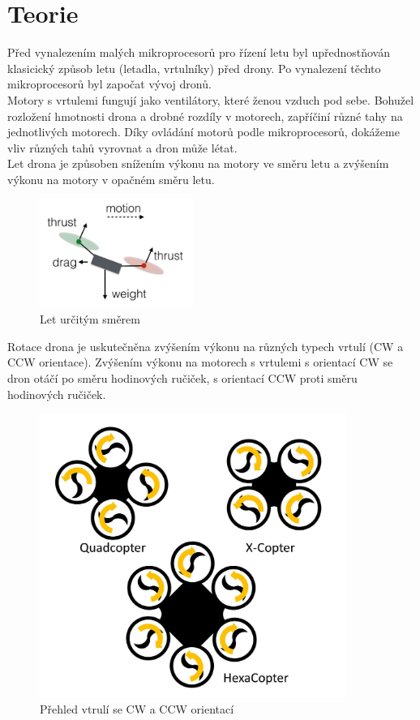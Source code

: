 \chapter{Teorie}
\label{2-teorie}

Před vynalezením malých mikroprocesorů pro řízení letu byl upřednostňován klasicický způsob letu (letadla, vrtulníky) před drony. Po vynalezení těchto mikroprocesorů byl započat vývoj dronů.\\
Motory s vrtulemi fungují jako ventilátory, které ženou vzduch pod sebe. Bohužel rozložení hmotnosti drona a drobné rozdíly v motorech, zapříčiní různé tahy na jednotlivých motorech. Díky ovládání motorů podle mikroprocesorů, dokážeme vliv různých tahů vyrovnat a dron může létat.\\
Let drona je způsoben snížením výkonu na motory ve směru letu a zvýšením výkonu na motory v opačném směru letu.
\begin{figure}[h]
	\centering
	\includegraphics[width=5cm]{pictures/dronfly.jpg}
	\caption{Let určitým směrem}
\end{figure}
 Rotace drona je uskutečněna zvýšením výkonu na různých typech vrtulí (CW a CCW orientace). Zvýšením výkonu na motorech s vrtulemi s orientací CW se dron otáčí po směru hodinových ručiček, s orientací CCW proti směru hodinových ručiček.\\
\begin{figure}[h]
	\centering
	\includegraphics[width=10cm]{pictures/dronrot.png}
	\caption{Přehled vtrulí se CW a CCW orientací}
\end{figure} 

